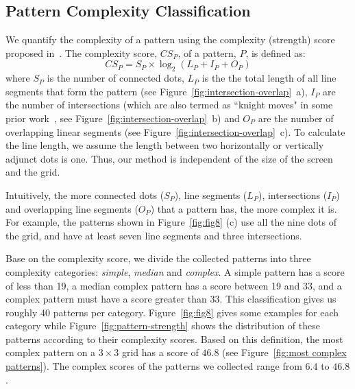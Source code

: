    \subsection{Pattern Complexity Classification}
    We quantify the complexity of a pattern using the complexity (strength) score proposed in~\cite{sun2014dissecting}.
        The complexity score, $CS_{P}$, of a pattern, $P$, is defined as:
    \begin{equation}
      CS_{P}=S_{P}\times\log_{2}(L_{P}+I_{P}+O_{P})
    \label{equ:compscore}
    \end{equation}
    where $S_{P}$ is the number of connected dots, $L_{P}$ is the the total length of all line segments that form the pattern (see Figure~\ref{fig:intersection-overlap}~a), $I_{P}$ are the number of intersections (which are also termed as ``knight moves" in some prior work~\cite{vonZezschwitz:2015:EDB:2702123.2702202}, see Figure~\ref{fig:intersection-overlap}~b) and $O_{P}$ are the number of overlapping linear segments (see Figure~\ref{fig:intersection-overlap}~c).  To calculate the line length, we assume the length between two horizontally or vertically adjunct dots is one. Thus, our method is independent of the size of the screen and the grid.


    Intuitively, the more connected dots ($S_{P}$), line segments ($L_{P}$),
    intersections ($I_{P}$) and overlapping line segments ($O_{P}$) that a
    pattern has, the more complex it is. For example, the patterns shown in
    Figure~\ref{fig:fig8} (c) use all the nine dots of the grid, and have  at
    least seven line segments and three intersections. %


    Base on the complexity score, we divide the collected patterns into three complexity categories: \emph{simple}, \emph{median} and \emph{complex}. A simple pattern has a score of less than 19,
    a median
    complex pattern has a score between 19 and 33, and a complex pattern must have a score greater than 33. This classification gives us roughly 40 patterns per
    category. Figure~\ref{fig:fig8} gives some examples for each category while Figure~\ref{fig:pattern-strength} shows the distribution of these patterns according to their complexity scores.
    Based on this definition, the most complex pattern on a $3 \times 3$ grid has a score of $46.8$ (see Figure~\ref{fig:most complex patterns}).  The complex scores of the patterns we collected range from $6.4$ to $46.8$.


